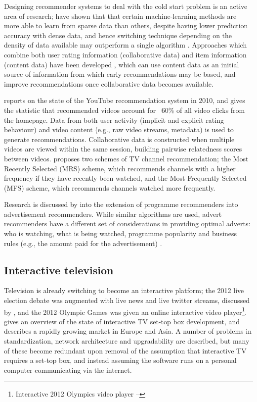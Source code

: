 	Designing recommender systems to deal with the cold start problem is an active area of research; \citet{cold-start-problem} have shown that that certain machine-learning methods are more able to learn from sparse data than others, despite having lower prediction accuracy with dense data, and hence switching technique depending on the density of data available may outperform a single algorithm . Approaches which combine both user rating information (collaborative data) and item information (content data) have been developed \citep{generative_models}, which can use content data as an initial source of information from which early recommendations may be based, and improve recommendations once collaborative data becomes available.

	\citet{davidson2012} reports on the state of the YouTube recommendation system in 2010, and gives the statistic that recommended videos account for ~60\% of all video clicks from the homepage. Data from both user activity (implicit and explicit rating behaviour) and video content (e.g., raw video streams, metadata) is used to generate recommendations. Collaborative data is constructed when multiple videos are viewed within the same session, building pairwise relatedness scores between videos. \citep{personalisedEPG} proposes two schemes of TV channel recommendation; the Most Recently Selected (MRS) scheme, which recommends channels with a higher frequency if they have recently been watched, and the Most Frequently Selected (MFS) scheme, which recommends channels watched more frequently.

	Research is discussed by \citet{contextual_advertising} into the extension of programme recommenders into advertisement recommenders. While similar algorithms are used, advert recommenders have a different set of considerations in providing optimal adverts: who is watching, what is being watched, programme popularity and business rules (e.g., the amount paid for the advertisement) \citep{contextual_advertising}. 

\subsection{Interactive television}
	\label{sec:background_interactive_tv}

	Television is already switching to become an interactive platform; the 2012 live election debate was augmented with live news and live twitter streams, discussed by \citet{2010_election}, and the 2012 Olympic Games was given an online interactive video player\footnote{Interactive 2012 Olympics video player -- }. \citet{tv_stb_overview} gives an overview of the state of interactive TV set-top box development, and describes a rapidly growing market in Europe and Asia. A number of problems in standardization, network architecture and upgradability are described, but many of these become redundant upon removal of the assumption that interactive TV requires a set-top box, and instead assuming the software runs on a personal computer communicating via the internet.

